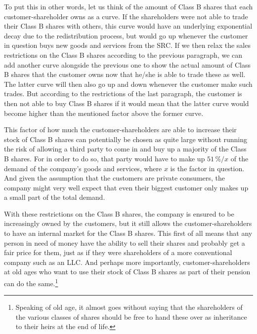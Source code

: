 \documentclass{article}
\begin{document}
To put this in other words, let us think of the amount of Class B shares that each customer-shareholder owns as a curve. If the shareholders were not able to trade their Class B shares with others, this curve would have an underlying exponential decay due to the redistribution process, but would go up whenever the customer in question buys new goods and services from the SRC. If we then relax the sales restrictions on the Class B shares according to the previous paragraph, we can add another curve alongside the previous one to show the actual amount of Class B shares that the customer owns now that he/she is able to trade these as well. The latter curve will then also go up and down whenever the customer make such trades. But according to the restrictions of the last paragraph, the customer is then not able to buy Class B shares if it would mean that the latter curve would become higher than the mentioned factor above the former curve.

This factor of how much the customer-shareholders are able to increase their stock of Class B shares can potentially be chosen as quite large without running the risk of allowing a third party to come in and buy up a majority of the Class B shares. 
For in order to do so, that party would have to make up $51\,\% / x$ of the demand of the company's goods and services, where $x$ is the factor in question. And given the assumption that the customers are private consumers, the company might very well expect that even their biggest customer only makes up a small part of the total demand.




With these restrictions on the Class B shares, the company is ensured to be increasingly owned by the customers, but it still allows the customer-shareholders to have an internal market for the Class B shares. This first of all means that any person in need of money have the ability to sell their shares and probably get a fair price for them, just as if they were shareholders of a more conventional company such as an LLC. And perhaps more importantly, customer-shareholders at old ages who want to use their stock of Class B shares as part of their pension can do the same.\footnote{
	Speaking of old age, it almost goes without saying that the shareholders of the various classes of shares should be free to hand these over as inheritance to their heirs at the end of life. 
}
\end{document}
